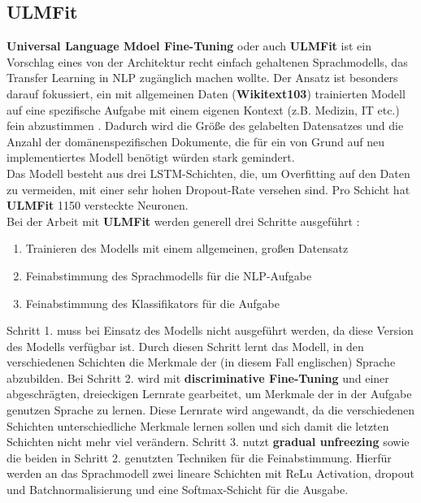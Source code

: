 \subsection{ULMFit}
\textbf{Universal Language Mdoel Fine-Tuning} oder auch \textbf{ULMFit} ist ein Vorschlag eines von der Architektur recht einfach gehaltenen Sprachmodells, das Transfer Learning in NLP zug\"anglich machen wollte. Der Ansatz ist besonders darauf fokussiert, ein mit allgemeinen Daten (\textbf{Wikitext103}) trainierten Modell auf eine spezifische Aufgabe mit einem eigenen Kontext (z.B. Medizin, IT etc.) fein abzustimmen \cite{ulm}. Dadurch wird die Gr\"o{\ss}e des gelabelten Datensatzes und die Anzahl der dom\"anenspezifischen Dokumente, die f\"ur ein von Grund auf neu implementiertes Modell ben\"otigt w\"urden stark gemindert.\\
Das Modell besteht aus drei LSTM-Schichten, die, um Overfitting auf den Daten zu vermeiden, mit einer sehr hohen Dropout-Rate versehen sind. Pro Schicht hat \textbf{ULMFit} 1150 versteckte Neuronen.\\
Bei der Arbeit mit \textbf{ULMFit} werden generell drei Schritte ausgef\"uhrt \cite{ulm}:
\begin{enumerate}
\item Trainieren des Modells mit einem allgemeinen, gro{\ss}en Datensatz 
\item Feinabstimmung des Sprachmodells f\"ur die NLP-Aufgabe
\item Feinabstimmung des Klassifikators f\"ur die Aufgabe
\end{enumerate}
Schritt 1. muss bei Einsatz des Modells nicht ausgef\"uhrt werden, da diese Version des Modells verf\"ugbar ist. Durch diesen Schritt lernt das Modell, in den verschiedenen Schichten die Merkmale der (in diesem Fall englischen) Sprache abzubilden. Bei Schritt 2. wird mit \textbf{discriminative Fine-Tuning} und einer abgeschr\"agten, dreieckigen Lernrate gearbeitet, um Merkmale der in der Aufgabe genutzen Sprache zu lernen. Diese Lernrate wird angewandt, da die verschiedenen Schichten unterschiedliche Merkmale lernen sollen und sich damit die letzten Schichten nicht mehr viel ver\"andern. Schritt 3. nutzt \textbf{gradual unfreezing} sowie die beiden in Schritt 2. genutzten Techniken f\"ur die Feinabstimmung. Hierf\"ur werden an das Sprachmodell zwei lineare Schichten mit ReLu Activation, dropout und Batchnormalisierung und eine Softmax-Schicht f\"ur die Ausgabe.


